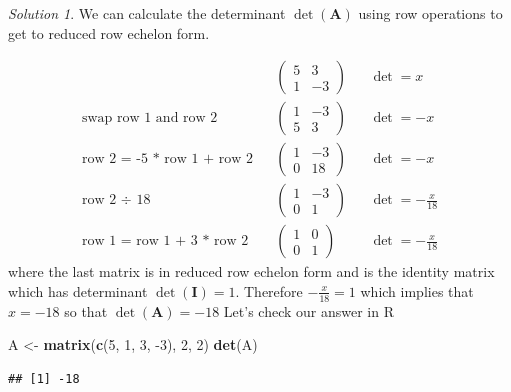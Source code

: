 \documentclass[
]{book}
\newenvironment{Shaded}{\begin{snugshade}}{\end{snugshade}}
\newcommand{\DecValTok}[1]{\textcolor[rgb]{0.00,0.00,0.81}{#1}}
\newcommand{\KeywordTok}[1]{\textcolor[rgb]{0.13,0.29,0.53}{\textbf{#1}}}
\newcommand{\NormalTok}[1]{#1}
\newcommand{\StringTok}[1]{\textcolor[rgb]{0.31,0.60,0.02}{#1}}
\theoremstyle{definition}
\theoremstyle{definition}
\theoremstyle{definition}
\theoremstyle{definition}
\theoremstyle{remark}
\newtheorem*{solution}{Solution}
\begin{document}
\begin{solution}

We can calculate the determinant \(\operatorname{det}(\mathbf{A})\) using row operations to get to reduced row echelon form.

\[
\begin{aligned}
&& \begin{pmatrix} 5 & 3 \\ 1 & -3 \end{pmatrix} && \operatorname{det} = x \\
\mbox{swap row 1 and row 2} && \begin{pmatrix} 1 & -3 \\ 5 & 3  \end{pmatrix} && \operatorname{det} = -x \\
\mbox{row 2 = -5 * row 1 + row 2} && \begin{pmatrix} 1 & -3 \\ 0 & 18  \end{pmatrix} && \operatorname{det} = -x \\
\mbox{row 2 } \div \mbox{ 18} && \begin{pmatrix} 1 & -3 \\ 0 & 1  \end{pmatrix} && \operatorname{det} = -\frac{x}{18} \\
\mbox{row 1 = row 1 + 3 * row 2} && \begin{pmatrix} 1 & 0 \\ 0 & 1  \end{pmatrix} && \operatorname{det} = -\frac{x}{18} 
\end{aligned}
\]
where the last matrix is in reduced row echelon form and is the identity matrix which has determinant \(\operatorname{det}(\mathbf{I}) = 1\). Therefore \(-\frac{x}{18} = 1\) which implies that \(x = -18\) so that \(\operatorname{det}(\mathbf{A}) = -18\)
Let's check our answer in R

\begin{Shaded}
\begin{Highlighting}[]
\NormalTok{A <-}\StringTok{ }\KeywordTok{matrix}\NormalTok{(}\KeywordTok{c}\NormalTok{(}\DecValTok{5}\NormalTok{, }\DecValTok{1}\NormalTok{, }\DecValTok{3}\NormalTok{, }\DecValTok{-3}\NormalTok{), }\DecValTok{2}\NormalTok{, }\DecValTok{2}\NormalTok{)}
\KeywordTok{det}\NormalTok{(A)}
\end{Highlighting}
\end{Shaded}

\begin{verbatim}
## [1] -18
\end{verbatim}

\end{solution}
\end{document}
